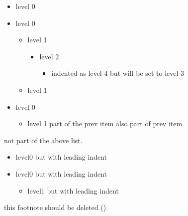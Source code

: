 \begin{itemize}
    \item level 0
    \item level 0
    \begin{itemize}
        \item level 1
        \begin{itemize}
            \item level 2
            \begin{itemize}
                \item indented as level 4 but will be set to level 3
            \end{itemize}
        \end{itemize}
    \item level 1
    \end{itemize}
\item level 0
    \begin{itemize}
        \item level 1 part of the prev item also part of prev item
    \end{itemize}
\end{itemize}

not part of the above list.



\begin{itemize}
\item level0 but with leading indent
\item level0 but with leading indent
\begin{itemize} 
 \item level1 but with leading indent 
\end{itemize}

\end{itemize}



this footnote should be deleted ()


